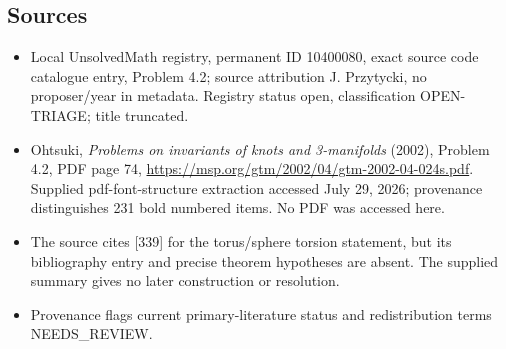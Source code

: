 \documentclass[11pt]{article}
\begin{document}
\subsection{Sources}
\begin{itemize}
\item Local UnsolvedMath registry, permanent ID 10400080, exact source code catalogue entry, Problem 4.2; source attribution J. Przytycki, no proposer/year in metadata. Registry status open, classification OPEN-TRIAGE; title truncated.
\item Ohtsuki, \emph{Problems on invariants of knots and 3-manifolds} (2002), Problem 4.2, PDF page 74, \url{https://msp.org/gtm/2002/04/gtm-2002-04-024s.pdf}. Supplied pdf-font-structure extraction accessed July 29, 2026; provenance distinguishes 231 bold numbered items. No PDF was accessed here.
\item The source cites [339] for the torus/sphere torsion statement, but its bibliography entry and precise theorem hypotheses are absent. The supplied summary gives no later construction or resolution.
\item Provenance flags current primary-literature status and redistribution terms NEEDS\_REVIEW.
\end{itemize}
\end{document}
